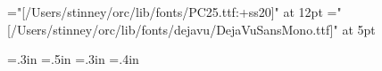 \let\everymathextra\relax
\let\preamble\relax

\let\seq\relax
\let\lname\relax
\let\sname\relax
\let\uname\relax
\let\chars\relax
\let\names\relax
\let\glyph\relax
\let\rglyf\relax
\let\image\relax
\let\notes\relax
\let\stags\relax

\let\sqdbcun\relax
\let\sqdbpua\relax
\let\sqseq\relax
\let\sqinv\relax
\let\sqchr\relax

\let\imagefloat\relax
\let\imagecaption\relax

\let\remfor\relax
\let\Hhhhh\relax

\let\ofspc\pcxxv

\def\unames{\eight\rm}

\def\ofs#1#2#3{}
\let\ofspc\pcxxv

\font\pcssxx="[/Users/stinney/orc/lib/fonts/PC25.ttf:+ss20]" at 12pt
\font\mono="[/Users/stinney/orc/lib/fonts/dejavu/DejaVuSansMono.ttf]" at 5pt

\def\ccchr{\pcssxx}
\def\ccuni{\mono}

\newdimen\ccwd \ccwd=.3in\relax
\newdimen\ccht \ccht=.5in\relax
\newdimen\cccwd \cccwd=.3in\relax
\newdimen\cccht \cccht=.4in\relax

\def\tbodyrule{\noalign{\hrule\vskip3pt plus1pt minus1pt}}


\def\not{\colorbox{ntgrey}}
\def\sqchr{\colorbox{sqyellow}}
\def\sqinv{\colorbox{sqblue}}
\def\sqopq{\colorbox{sqpink}}
\def\sqseq{\colorbox{sqgreen}}

\def\ucode#1{\eight\rm}

\def\tablerule{\noalign{\hrule}}

\let\trhook\relax
\def\tvrule{\vrule}

\def\codechart{\def\thead{\eight\rm}%
  \def\trhook{\message{trhook}\gdef\tvrule{\vrule width1pt\relax\gdef\tvrule{\vrule\relax}}}%
}

\endinput
